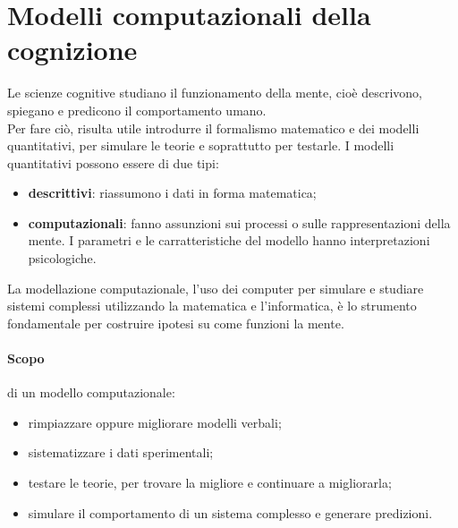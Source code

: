 \section{Modelli computazionali della cognizione}

Le scienze cognitive studiano il funzionamento della mente, cioè descrivono,
spiegano e predicono il comportamento umano.\\
Per fare ciò, risulta utile introdurre il formalismo matematico e dei modelli
quantitativi, per simulare le teorie e soprattutto per testarle.
I modelli quantitativi possono essere di due tipi:
\begin{itemize}
	\item \textbf{descrittivi}: riassumono i dati in forma matematica;

	\item \textbf{computazionali}: fanno assunzioni sui processi o sulle
	rappresentazioni della mente. I parametri e le carratteristiche del modello
	hanno interpretazioni psicologiche.
\end{itemize}

La modellazione computazionale, l'uso dei computer per simulare e studiare
sistemi complessi utilizzando la matematica e l'informatica, è lo strumento
fondamentale per costruire ipotesi su come funzioni la mente.

\paragraph{Scopo} di un modello computazionale:
\begin{itemize}
	\item rimpiazzare oppure migliorare modelli verbali;

	\item sistematizzare i dati sperimentali;

	\item testare le teorie, per trovare la migliore e continuare a migliorarla;

	\item simulare il comportamento di un sistema complesso e generare
		predizioni.
\end{itemize}

